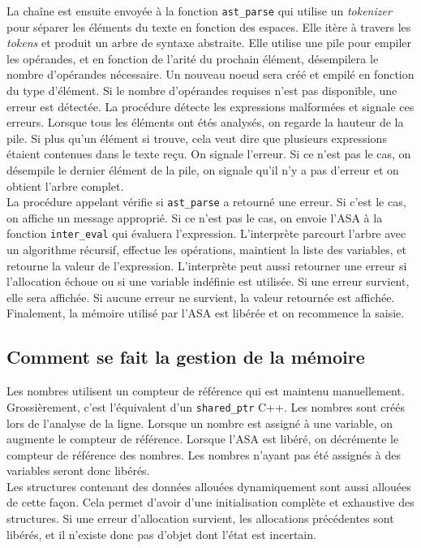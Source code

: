 \documentclass[a4paper,12pt,french]{article}
\begin{document}
		La chaîne est ensuite envoyée à la fonction \lstinline$ast_parse$ qui utilise un \textit{tokenizer} pour séparer les éléments du texte en fonction des espaces. Elle itère à travers les \textit{tokens} et produit un arbre de syntaxe abstraite. Elle utilise une pile pour empiler les opérandes, et en fonction
		de l'arité du prochain élément, désempilera le nombre d'opérandes nécessaire. Un nouveau
		noeud sera créé et empilé en fonction du type d'élément. Si le nombre d'opérandes requises
		n'est pas disponible, une erreur est détectée. La procédure détecte les expressions malformées
		et signale ces erreurs. Lorsque tous les éléments ont étés analysés, on regarde la hauteur de
		la pile. Si plus qu'un élément si trouve, cela veut dire que plusieurs expressions étaient
		contenues dans le texte reçu. On signale l'erreur. Si ce n'est pas le cas, on désempile le dernier
		élément de la pile, on signale qu'il n'y a pas d'erreur et on obtient l'arbre complet.\\
		
		La procédure appelant vérifie si \lstinline$ast_parse$ a retourné une erreur. Si c'est le cas, on affiche
		un message approprié. Si ce n'est pas le cas, on envoie l'ASA à la fonction \lstinline$inter_eval$ qui évaluera l'expression. L'interprète parcourt l'arbre avec un algorithme récursif, effectue les opérations,
		maintient la liste des variables, et retourne la valeur de l'expression. L'interprète peut aussi
		retourner une erreur si l'allocation échoue ou si une variable indéfinie est utilisée. Si une erreur
		survient, elle sera affichée. Si aucune erreur ne survient, la valeur retournée est affichée.
		Finalement, la mémoire utilisé par l'ASA est libérée et on recommence la saisie.\\
		
		\subsection{Comment se fait la gestion de la mémoire}
		Les nombres utilisent un compteur de référence qui est maintenu manuellement. Grossièrement,
		c'est l'équivalent d'un \lstinline$shared_ptr$ C++. Les nombres sont créés lors de l'analyse de la
		ligne. Lorsque un nombre est assigné à une variable, on augmente le compteur de
		référence. Lorsque l'ASA est libéré, on décrémente le compteur de référence des nombres.
		Les nombres n'ayant pas été assignés à des variables seront donc libérés.\\
		
		Les structures contenant des données allouées dynamiquement sont aussi allouées de cette
		façon. Cela permet d'avoir d'une initialisation complète et exhaustive des structures.
		Si une erreur d'allocation survient, les allocations précédentes sont libérés, et il
		n'existe donc pas d'objet dont l'état est incertain.\\
		
\end{document}
